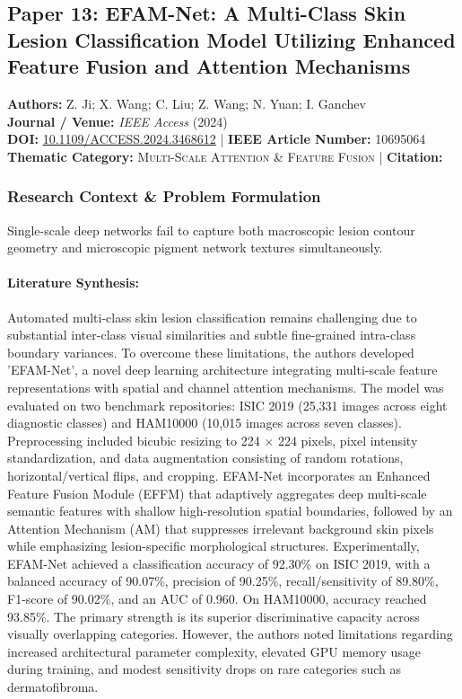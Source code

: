 \subsection{Paper 13: EFAM-Net: A Multi-Class Skin Lesion Classification Model Utilizing Enhanced Feature Fusion and Attention Mechanisms}
\label{sec:paper_13}

\begin{tcolorbox}[colback=gray!5!white,colframe=gray!75!black,title=\textbf{Metadata \& Citation Summary}]
\textbf{Authors:} Z. Ji; X. Wang; C. Liu; Z. Wang; N. Yuan; I. Ganchev \\
\textbf{Journal / Venue:} \textit{IEEE Access} (2024) \\
\textbf{DOI:} \href{https://doi.org/10.1109/ACCESS.2024.3468612}{10.1109/ACCESS.2024.3468612} \quad | \quad \textbf{IEEE Article Number:} 10695064 \\
\textbf{Thematic Category:} \textsc{Multi-Scale Attention \& Feature Fusion} \quad | \quad \textbf{Citation:} \cite{10695064}
\end{tcolorbox}

\subsubsection*{Research Context \& Problem Formulation}
Single-scale deep networks fail to capture both macroscopic lesion contour geometry and microscopic pigment network textures simultaneously.

\paragraph{Literature Synthesis:} Automated multi-class skin lesion classification remains challenging due to substantial inter-class visual similarities and subtle fine-grained intra-class boundary variances. To overcome these limitations, the authors developed 'EFAM-Net', a novel deep learning architecture integrating multi-scale feature representations with spatial and channel attention mechanisms. The model was evaluated on two benchmark repositories: ISIC 2019 (25,331 images across eight diagnostic classes) and HAM10000 (10,015 images across seven classes). Preprocessing included bicubic resizing to 224 $\times$ 224 pixels, pixel intensity standardization, and data augmentation consisting of random rotations, horizontal/vertical flips, and cropping. EFAM-Net incorporates an Enhanced Feature Fusion Module (EFFM) that adaptively aggregates deep multi-scale semantic features with shallow high-resolution spatial boundaries, followed by an Attention Mechanism (AM) that suppresses irrelevant background skin pixels while emphasizing lesion-specific morphological structures. Experimentally, EFAM-Net achieved a classification accuracy of 92.30\% on ISIC 2019, with a balanced accuracy of 90.07\%, precision of 90.25\%, recall/sensitivity of 89.80\%, F1-score of 90.02\%, and an AUC of 0.960. On HAM10000, accuracy reached 93.85\%. The primary strength is its superior discriminative capacity across visually overlapping categories. However, the authors noted limitations regarding increased architectural parameter complexity, elevated GPU memory usage during training, and modest sensitivity drops on rare categories such as dermatofibroma.

